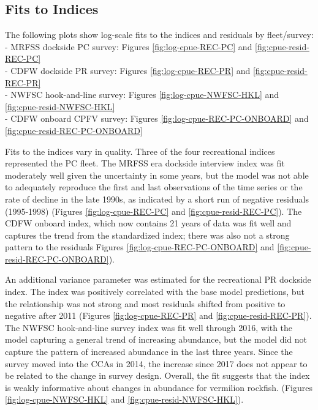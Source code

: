 \documentclass[
  english,
  a4paper,
]{article}
\begin{document}
\hypertarget{fits-to-indices}{%
\subsection{Fits to Indices}\label{fits-to-indices}}

The following plots show log-scale fits to the indices and residuals by fleet/survey:\\
- MRFSS dockside PC survey: Figures \ref{fig:log-cpue-REC-PC} and \ref{fig:cpue-resid-REC-PC}\\
- CDFW dockside PR survey: Figures \ref{fig:log-cpue-REC-PR} and \ref{fig:cpue-resid-REC-PR}\\
- NWFSC hook-and-line survey: Figures \ref{fig:log-cpue-NWFSC-HKL} and \ref{fig:cpue-resid-NWFSC-HKL}\\
- CDFW onboard CPFV survey: Figures \ref{fig:log-cpue-REC-PC-ONBOARD} and \ref{fig:cpue-resid-REC-PC-ONBOARD}

Fits to the indices vary in quality. Three of the four recreational indices represented
the PC fleet. The MRFSS era dockside interview index was fit moderately well given the uncertainty
in some years, but the model was not able to adequately reproduce the first and last observations of the time series or the rate of decline in the late 1990s, as indicated by a short run of negative residuals (1995-1998) (Figures \ref{fig:log-cpue-REC-PC} and \ref{fig:cpue-resid-REC-PC}).
The CDFW onboard index, which now contains 21 years of data was fit well and captures the trend from
the standardized index; there was also not a strong pattern to the residuals
Figures \ref{fig:log-cpue-REC-PC-ONBOARD} and \ref{fig:cpue-resid-REC-PC-ONBOARD}).

An additional variance parameter was estimated for the recreational PR dockside index. The index was positively correlated with the base model predictions, but the relationship was not strong and most residuals shifted from positive to negative after 2011 (Figures \ref{fig:log-cpue-REC-PR} and \ref{fig:cpue-resid-REC-PR}).
The NWFSC hook-and-line survey index was fit well through 2016, with the model capturing a general trend of increasing abundance, but the model did not capture
the pattern of increased abundance in the last three years. Since the survey moved into the CCAs in 2014, the increase since 2017 does not appear to be related to the change in survey design. Overall, the fit suggests that the index is weakly informative about changes in abundance for vermilion rockfish.
(Figures \ref{fig:log-cpue-NWFSC-HKL} and \ref{fig:cpue-resid-NWFSC-HKL}).
\end{document}
